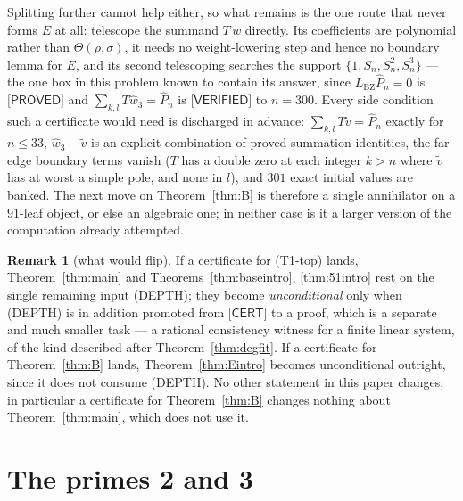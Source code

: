 \documentclass[11pt,reqno]{amsart}
\theoremstyle{plain}
\theoremstyle{definition}
\newtheorem{remark}[theorem]{Remark}
\theoremstyle{remark}
\numberwithin{equation}{section}
\newcommand{\LBZ}{L_{\mathrm{BZ}}}
\newcommand{\wthree}{\hat w_3}
\newcommand{\PROVED}{\textsf{[PROVED]}}
\newcommand{\VERIFIED}{\textsf{[VERIFIED]}}
\newcommand{\CERT}{\textsf{[CERT]}}
\begin{document}
Splitting further cannot help either, so what remains is the one route that never forms $E$ at
all: telescope the summand $T\,w$ directly. Its coefficients are polynomial rather than
$\Theta(\rho,\sigma)$, it needs no weight-lowering step and hence no boundary lemma for $E$,
and its second telescoping searches the support $\{1,S_n,S_n^2,S_n^3\}$ --- the one box in this
problem known to contain its answer, since $\LBZ\hat P_n=0$ is $\PROVED$ and
$\sum_{k,l}T\wthree=\hat P_n$ is $\VERIFIED$ to $n=300$. Every side condition such a certificate
would need is discharged in advance: $\sum_{k,l}T\tilde v=\hat
P_n$ exactly for $n\le33$, $\wthree-\tilde v$ is an explicit combination of proved summation
identities, the far-edge boundary
terms vanish ($T$ has a double zero at each integer $k>n$ where $\tilde v$ has at worst a simple
pole, and none in $l$), and $301$ exact initial values are banked. The next move on
Theorem~\ref{thm:B} is therefore a single annihilator on a $91$-leaf object, or else an
algebraic one; in neither case is it a larger version of the computation already attempted.

\begin{remark}[what would flip]\label{rem:flip}
If a certificate for (T1-top) lands, Theorem~\ref{thm:main} and Theorems~\ref{thm:baseintro},
\ref{thm:51intro} rest on the single remaining input (DEPTH); they become
\emph{unconditional} only when (DEPTH) is in addition promoted from $\CERT$ to a proof, which
is a separate and much smaller task --- a rational consistency witness for a finite linear
system, of the kind described after Theorem~\ref{thm:degfit}. If a certificate for
Theorem~\ref{thm:B} lands, Theorem~\ref{thm:Eintro} becomes unconditional outright, since it
does not consume (DEPTH). No other statement in this paper changes; in particular a certificate
for Theorem~\ref{thm:B} changes nothing about Theorem~\ref{thm:main}, which does not use it.
\end{remark}

\section{The primes 2 and 3}\label{sec:twothree}
\end{document}
